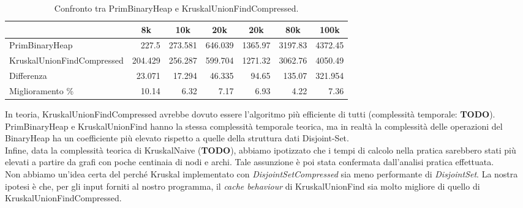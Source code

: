 \begin{table}[H]
\centering
    \begin{tabular}{|l|rrrrrr|}
    \hline
    &  \multicolumn{1}{c}{8k} & \multicolumn{1}{c}{10k} & \multicolumn{1}{c}{20k} & \multicolumn{1}{c}{20k} & \multicolumn{1}{c}{80k} &           \multicolumn{1}{c|}{100k} \\
    \hline
 PrimBinaryHeap             & 227.5   & 273.581 & 646.039 & 1365.97 & 3197.83 & 4372.45  \\
 KruskalUnionFindCompressed & 204.429 & 256.287 & 599.704 & 1271.32 & 3062.76 & 4050.49 \\ \hline
     Differenza                 &  23.071 &  17.294 &  46.335 &   94.65 &  135.07 &  321.954 \\
     Miglioramento \%              &  10.14  &   6.32  &   7.17  &    6.93 &    4.22 &    7.36  \\
    \hline
    \end{tabular}
    \caption{Confronto tra PrimBinaryHeap e KruskalUnionFindCompressed.}
    \label{table:prim-binary-heap-vs-kruskal-union-find-compressed}
\end{table}



\noindent In teoria, KruskalUnionFindCompressed avrebbe dovuto essere l'algoritmo più efficiente di tutti (complessità temporale: \textbf{TODO}).
\noindent PrimBinaryHeap e KruskalUnionFind hanno la stessa complessità temporale teorica, ma in realtà la complessità delle operazioni del BinaryHeap ha un coefficiente più elevato rispetto a quelle della struttura dati Disjoint-Set. \\

\noindent Infine, data la complessità teorica di KruskalNaive (\textbf{TODO}), abbiamo ipotizzato che i tempi di calcolo nella pratica sarebbero stati più elevati a partire da grafi con poche centinaia di nodi e archi. Tale assunzione è poi stata confermata dall'analisi pratica effettuata. \\

\noindent Non abbiamo un'idea certa del perché Kruskal implementato con \textit{DisjointSetCompressed} sia meno performante di \textit{DisjointSet}. La nostra ipotesi è che, per gli input forniti al nostro programma, il \textit{cache behaviour} di KruskalUnionFind sia molto migliore di quello di KruskalUnionFindCompressed.
